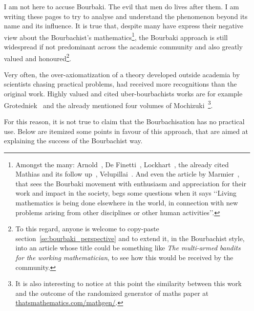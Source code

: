 \documentclass[]{scrartcl}
\theoremstyle{definition}
\begin{document}


I am not here to accuse Bourbaki. The evil that men do lives after them. I am writing these pages to try to analyse and understand the phenomenon beyond its name and its influence.
It is true that, despite many have express their negative view about the Bourbachist's mathematics\footnote{
    Amongst the many: Arnold~\cite{arnol1998teaching}, De Finetti~\cite{de2008bruno}, Lockhart~\cite{lockhart2009mathematician}, the already cited Mathias and its follow up~\cite{mathias1998further}, Velupillai~\cite{velupillai2012bourbaki}. And even the article by Marmier~\cite{marmier2014idea}, that sees the Bourbaki movement with enthusiasm and appreciation for their work and impact in the society, begs some questions when it says
    \lq\lq Living mathematics is being done elsewhere in the world, in connection with new problems arising from other disciplines or other human activities\rq\rq.
}, the Bourbaki approach is still widespread if not predominant across the academic community and also greatly valued and honoured\footnote{
    To this regard, anyone is welcome to copy-paste section~\ref{se:bourbaki_perspective} and to extend it, in the Bourbachist style, into an article whose title could be something like \emph{The multi-armed bandits for the working mathematician}, to see how this would be received by the community.
}.

Very often, the over-axiomatization of a theory developed outside academia by scientists chasing practical problems, had received more recognitions than the original work.
Highly valued and cited uber-bourbachists works are for example Grotedniek~\cite{grothendieck2011some} and the already mentioned four volumes of Mochizuki~\cite{mochizuki2012inter}\footnote{
    It is also interesting to notice at this point the similarity between this work and the outcome of the randomized generator of maths paper at \href{https://thatsmathematics.com/mathgen/}{thatsmathematics.com/mathgen/}.
}.

For this reason, it is not true to claim that the Bourbachisation has no practical use. Below are itemized some points in favour of this approach, that are aimed at explaining the success of the Bourbachist way.
\end{document}
